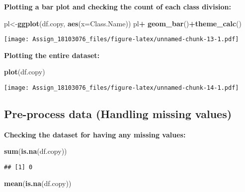 \documentclass[
]{article}
\newenvironment{Shaded}{\begin{snugshade}}{\end{snugshade}}
\newcommand{\DataTypeTok}[1]{\textcolor[rgb]{0.13,0.29,0.53}{#1}}
\newcommand{\KeywordTok}[1]{\textcolor[rgb]{0.13,0.29,0.53}{\textbf{#1}}}
\newcommand{\NormalTok}[1]{#1}
\newcommand{\OperatorTok}[1]{\textcolor[rgb]{0.81,0.36,0.00}{\textbf{#1}}}
\newcommand{\StringTok}[1]{\textcolor[rgb]{0.31,0.60,0.02}{#1}}
\begin{document}
\textbf{Plotting a bar plot and checking the count of each class
division:}

\begin{Shaded}
\begin{Highlighting}[]
\NormalTok{pl<-}\KeywordTok{ggplot}\NormalTok{(df.copy, }\KeywordTok{aes}\NormalTok{(}\DataTypeTok{x=}\NormalTok{Class.Name))}
\NormalTok{pl}\OperatorTok{+}\StringTok{ }\KeywordTok{geom_bar}\NormalTok{()}\OperatorTok{+}\KeywordTok{theme_calc}\NormalTok{()}
\end{Highlighting}
\end{Shaded}

\texttt{[image: Assign\_18103076\_files/figure-latex/unnamed-chunk-13-1.pdf]}

\textbf{Plotting the entire dataset:}

\begin{Shaded}
\begin{Highlighting}[]
\KeywordTok{plot}\NormalTok{(df.copy)}
\end{Highlighting}
\end{Shaded}

\texttt{[image: Assign\_18103076\_files/figure-latex/unnamed-chunk-14-1.pdf]}

\hypertarget{pre-process-data-handling-missing-values}{%
\subsection{\texorpdfstring{\textbf{Pre-process data (Handling missing
values)}}{Pre-process data (Handling missing values)}}\label{pre-process-data-handling-missing-values}}

\textbf{Checking the dataset for having any missing values:}

\begin{Shaded}
\begin{Highlighting}[]
\KeywordTok{sum}\NormalTok{(}\KeywordTok{is.na}\NormalTok{(df.copy))}
\end{Highlighting}
\end{Shaded}

\begin{verbatim}
## [1] 0
\end{verbatim}

\begin{Shaded}
\begin{Highlighting}[]
\KeywordTok{mean}\NormalTok{(}\KeywordTok{is.na}\NormalTok{(df.copy))}
\end{Highlighting}
\end{Shaded}
\end{document}
